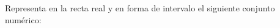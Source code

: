 \documentclass[addpoints,spanish, 12pt,a4paper]{exam}
\begin{document}
\begin{questions}





\question Representa en la recta real y en forma de intervalo el siguiente conjunto numérico:
\end{questions}
\end{document}
